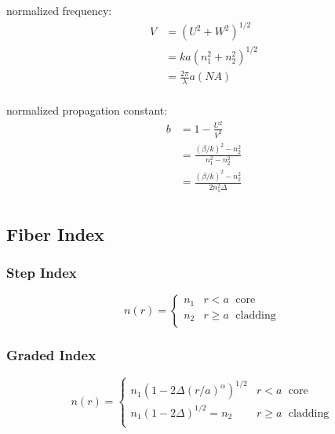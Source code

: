 \documentclass[12pt, onecolumn]{article}
\begin{document}
        normalized frequency:
        \begin{equation}
            \begin{aligned}
                V   &= \left(U^2 + W^2\right)^{1/2} \\
                    &= ka\left(n_1^2 + n_2^2\right)^{1/2} \\
                    &= \frac{2\pi}{\lambda}a(NA)\\
            \end{aligned}
        \end{equation}

        normalized propagation constant:
        \begin{equation}
            \begin{aligned}
                b   &= 1 - \displaystyle\frac{U^2}{V^2} \\
                    &= \displaystyle\frac{(\beta/k)^2 - n_2^2}{n_1^2 - n_2^2} \\
                    &= \displaystyle\frac{(\beta/k)^2 - n_2^2}{2n_1^2 \Delta} \\
            \end{aligned}
        \end{equation}
    
    \subsection{Fiber Index}
        \subsubsection{Step Index}
            \begin{equation}
                n(r) = 
                \begin{cases}
                    n_1 & r < a \; \text{ core } \\
                    n_2 & r \ge a \; \text{ cladding } \\                    
                \end{cases}
                \label{eq:step_index}
            \end{equation}

        \subsubsection{Graded Index}
            \begin{equation}
                n(r) = 
                \begin{cases}
                    n_1(1-2\Delta(r/a)^\alpha)^{1/2} & r < a \; \text{ core } \\
                    n_1(1-2\Delta)^{1/2} = n_2 & r \ge a \; \text{ cladding } \\                    
                \end{cases}
                \label{eq:graded_index}
            \end{equation}
\end{document}
